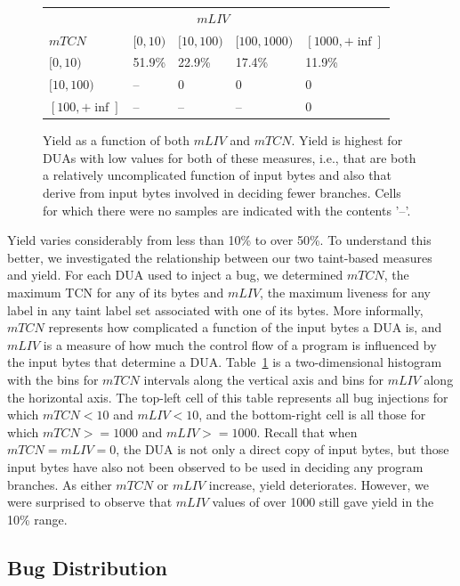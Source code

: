 \begin{figure}[b]
\centering
\begin{tabular}{l|l|l|l|l} 
       & \multicolumn{3}{c}{$mLIV$} &  \\  
$mTCN$ &         $[0,10)$ & $[10,100)$ & $[100,1000)$ & $[1000,+\inf]$ \\  \hline 
$[0,10)$ &       51.9\%   & 22.9\%     & 17.4\%       & 11.9\%          \\
$[10,100)$ &     --       & 0          & 0            & 0     \\
$[100,+\inf]$ &  --       & --         & --           & 0     \\ 
\end{tabular}
\caption{Yield as a function of both $mLIV$ and $mTCN$.  
Yield is highest for DUAs with low values for both of these measures, i.e., that are both a relatively uncomplicated function of input bytes and also that derive from input bytes involved in deciding fewer branches.
Cells for which there were no samples are indicated with the contents '--'.}
\label{table:yield-breakdown}
\end{figure}

Yield varies considerably from less than 10\% to over 50\%.
To understand this better, we investigated the relationship between our two taint-based measures and yield.
For each DUA used to inject a bug, we determined $mTCN$, the maximum TCN for any of its bytes and $mLIV$, the maximum liveness for any label in any taint label set associated with one of its bytes.  
More informally, $mTCN$ represents how complicated a function of the input bytes a DUA is, and $mLIV$ is a measure of how much the control flow of a program is influenced by the input bytes that determine a DUA.
Table~\ref{table:yield-breakdown} is a two-dimensional histogram with the bins for $mTCN$ intervals along the vertical axis and bins for $mLIV$ along the horizontal axis.
The top-left cell of this table represents all bug injections for which $mTCN<10$ and $mLIV<10$, and the bottom-right cell is all those for which $mTCN>=1000$ and $mLIV>=1000$.
Recall that when  $mTCN=mLIV=0$, the DUA is not only a direct copy of input bytes, but those input bytes have also not been observed to be used in deciding any program branches. 
As either $mTCN$ or $mLIV$ increase, yield deteriorates.  
However, we were surprised to observe that $mLIV$ values of over 1000 still gave yield in the 10\% range.

\subsection{Bug Distribution}

